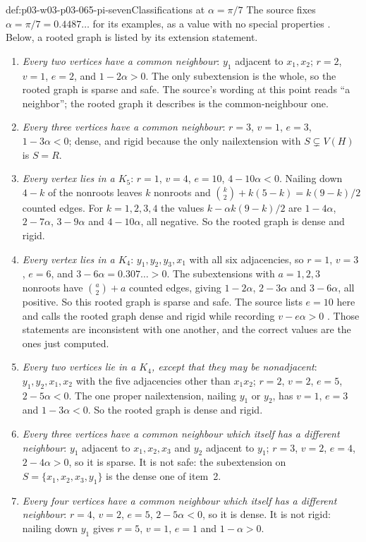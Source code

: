 \begin{hbexample}{def:p03-w03-p03-065-pi-seven}{Classifications at \(\alpha=\pi/7\)}
The source fixes \(\alpha=\pi/7=0.4487\ldots\) for its examples, as a value
with no special properties \cite[p.~7]{Spencer2007LogicRandomStructuresAuthor}.  Below, a
rooted graph is listed by its extension statement.
\begin{enumerate}
\item \emph{Every two vertices have a common neighbour}: \(y_1\) adjacent to
\(x_1,x_2\); \(r=2\), \(v=1\), \(e=2\), and \(1-2\alpha>0\).  The only
subextension is the whole, so the rooted graph is sparse and safe.  The
source's wording at this point reads ``a neighbor''; the rooted graph it
describes is the common-neighbour one.
\item \emph{Every three vertices have a common neighbour}: \(r=3\), \(v=1\),
\(e=3\), \(1-3\alpha<0\); dense, and rigid because the only nailextension
with \(S\subsetneq V(H)\) is \(S=R\).
\item \emph{Every vertex lies in a \(K_5\)}: \(r=1\), \(v=4\), \(e=10\),
\(4-10\alpha<0\).  Nailing down \(4-k\) of the nonroots leaves \(k\) nonroots
and \(\binom k2+k(5-k)=k(9-k)/2\) counted edges.  For \(k=1,2,3,4\) the values
\(k-\alpha k(9-k)/2\) are \(1-4\alpha\), \(2-7\alpha\), \(3-9\alpha\) and
\(4-10\alpha\), all negative.  So the rooted graph is dense and rigid.
\item \emph{Every vertex lies in a \(K_4\)}: \(y_1,y_2,y_3,x_1\) with all six
adjacencies, so \(r=1\), \(v=3\), \(e=6\), and \(3-6\alpha=0.307\ldots>0\).
The subextensions with \(a=1,2,3\) nonroots have \(\binom a2+a\) counted
edges, giving \(1-2\alpha\), \(2-3\alpha\) and \(3-6\alpha\), all positive.
So this rooted graph is sparse and safe.  The source lists \(e=10\) here and
calls the rooted graph dense and rigid while recording \(v-e\alpha>0\)
\cite[p.~7]{Spencer2007LogicRandomStructuresAuthor}.  Those statements are inconsistent with
one another, and the correct values are the ones just computed.
\item \emph{Every two vertices lie in a \(K_4\), except that they may be
nonadjacent}: \(y_1,y_2,x_1,x_2\) with the five adjacencies other than
\(x_1x_2\); \(r=2\), \(v=2\), \(e=5\), \(2-5\alpha<0\).  The one proper
nailextension, nailing \(y_1\) or \(y_2\), has \(v=1\), \(e=3\) and
\(1-3\alpha<0\).  So the rooted graph is dense and rigid.
\item \emph{Every three vertices have a common neighbour which itself has a
different neighbour}: \(y_1\) adjacent to \(x_1,x_2,x_3\) and \(y_2\)
adjacent to \(y_1\); \(r=3\), \(v=2\), \(e=4\), \(2-4\alpha>0\), so it is
sparse.  It is not safe: the subextension on
\(S=\{x_1,x_2,x_3,y_1\}\) is the dense one of item~2.
\item \emph{Every four vertices have a common neighbour which itself has a
different neighbour}: \(r=4\), \(v=2\), \(e=5\), \(2-5\alpha<0\), so it is
dense.  It is not rigid: nailing down \(y_1\) gives \(r=5\), \(v=1\), \(e=1\)
and \(1-\alpha>0\).
\end{enumerate}
\end{hbexample}

